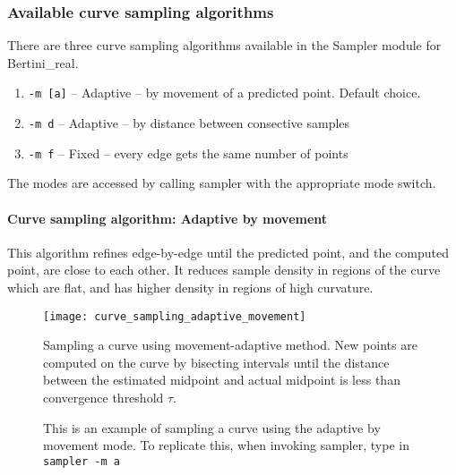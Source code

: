  	\subsubsection{Available curve sampling algorithms}
 	

 	There are three curve sampling algorithms available in the Sampler module for Bertini\_real.

 	\begin{enumerate}

 		\item {\tt -m [a]} -- Adaptive -- by movement of a predicted point.  Default choice.

 		\item {\tt -m d} -- Adaptive -- by distance between consective samples

 		\item {\tt -m f} -- Fixed -- every edge gets the same number of points

 	\end{enumerate}

The modes are accessed by calling sampler with the appropriate mode switch.


\paragraph{Curve sampling algorithm: Adaptive by movement}

This algorithm refines edge-by-edge until the predicted point, and the computed point, are close to each other.  It reduces sample density in regions of the curve which are flat, and has higher density in regions of high curvature.


\begin{figure}[H]
\begin{center}
\texttt{[image: curve\_sampling\_adaptive\_movement]}
\caption[Adaptive-movement curve sampling]{Sampling a curve using movement-adaptive method.  New points are computed on the curve by bisecting intervals until the distance between the estimated midpoint and actual midpoint is less than convergence threshold $\tau$.}
\end{center}
\end{figure}
 

\begin{figure}[!htb]\centering
     \caption{This is an example of sampling a curve using the adaptive by movement mode. To replicate this, when invoking sampler, type in {\tt sampler -m a}}
\end{figure}


